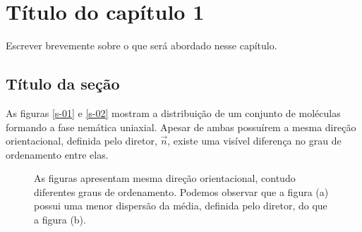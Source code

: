 \hypertarget{cap1}{}
\chapter{Título do capítulo 1}

Escrever brevemente sobre o que será abordado nesse capítulo.

\section{Título da seção}

As figuras \ref{s-01} e \ref{s-02} mostram a distribuição de um
conjunto de moléculas formando a fase nemática uniaxial. Apesar de
ambas possuírem a mesma direção orientacional, definida pelo diretor,
$\vec{n}$, existe uma visível diferença no grau de ordenamento entre
elas.
\begin{figure}[!htb]
	\centering
	\hspace{1cm}
	\caption{As figuras apresentam mesma direção orientacional,
contudo diferentes graus de ordenamento. Podemos observar que a figura
(a) possui uma menor dispersão da média, definida pelo diretor,
do que a figura (b).}
	\label{fig1}
\end{figure}

